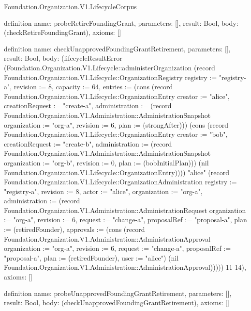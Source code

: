 \begin{lexlean}{Foundation.Organization.V1.LifecycleCorpus}
\begin{semanticmodule}
definition{
  name: probeRetireFoundingGrant,
  parameters: [],
  result: Bool,
  body: (checkRetireFoundingGrant),
  axioms: []
}

definition{
  name: checkUnapprovedFoundingGrantRetirement,
  parameters: [],
  result: Bool,
  body: (lifecycleResultError (Foundation.Organization.V1.Lifecycle::administerOrganization (record Foundation.Organization.V1.Lifecycle::OrganizationRegistry {registry := "registry-a", revision := 8, capacity := 64, entries := (cons (record Foundation.Organization.V1.Lifecycle::OrganizationEntry {creator := "alice", creationRequest := "create-a", administration := (record Foundation.Organization.V1.Administration::AdministrationSnapshot {organization := "org-a", revision := 6, plan := (strongAfter)})}) (cons (record Foundation.Organization.V1.Lifecycle::OrganizationEntry {creator := "bob", creationRequest := "create-b", administration := (record Foundation.Organization.V1.Administration::AdministrationSnapshot {organization := "org-b", revision := 0, plan := (bobInitialPlan)})}) (nil Foundation.Organization.V1.Lifecycle::OrganizationEntry)))}) "alice" (record Foundation.Organization.V1.Lifecycle::OrganizationAdministration {registry := "registry-a", revision := 8, actor := "alice", organization := "org-a", administration := (record Foundation.Organization.V1.Administration::AdministrationRequest {organization := "org-a", revision := 6, request := "change-a", proposalRef := "proposal-a", plan := (retiredFounder), approvals := (cons (record Foundation.Organization.V1.Administration::AdministrationApproval {organization := "org-a", revision := 6, request := "change-a", proposalRef := "proposal-a", plan := (retiredFounder), user := "alice"}) (nil Foundation.Organization.V1.Administration::AdministrationApproval))})})) 11 14),
  axioms: []
}

definition{
  name: probeUnapprovedFoundingGrantRetirement,
  parameters: [],
  result: Bool,
  body: (checkUnapprovedFoundingGrantRetirement),
  axioms: []
}


\end{semanticmodule}
\end{lexlean}
